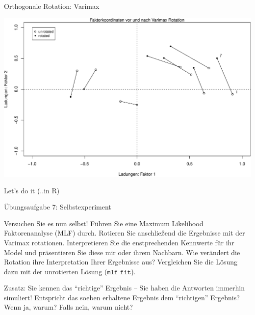 \documentclass[
  ignorenonframetext,
]{beamer}
\newenvironment{Shaded}{\begin{snugshade}}{\end{snugshade}}
\newcommand{\AttributeTok}[1]{\textcolor[rgb]{0.77,0.63,0.00}{#1}}
\newcommand{\CommentTok}[1]{\textcolor[rgb]{0.56,0.35,0.01}{\textit{#1}}}
\newcommand{\DecValTok}[1]{\textcolor[rgb]{0.00,0.00,0.81}{#1}}
\newcommand{\FunctionTok}[1]{\textcolor[rgb]{0.00,0.00,0.00}{#1}}
\newcommand{\NormalTok}[1]{#1}
\newcommand{\OtherTok}[1]{\textcolor[rgb]{0.56,0.35,0.01}{#1}}
\newcommand{\SpecialCharTok}[1]{\textcolor[rgb]{0.00,0.00,0.00}{#1}}
\newcommand{\StringTok}[1]{\textcolor[rgb]{0.31,0.60,0.02}{#1}}
\begin{document}
\begin{frame}[fragile]{Orthogonale Rotation: Varimax}
\begin{center}\includegraphics[width=0.7\linewidth]{06-EFA_files/figure-beamer/unnamed-chunk-7-1} \end{center}
\end{frame}

\begin{frame}[fragile]{Let's do it (..in R)}
\protect\hypertarget{lets-do-it-..in-r}{}
\begin{Shaded}
\end{Shaded}
\end{frame}

\begin{frame}{Übungsaufgabe 7: Selbstexperiment}
\protect\hypertarget{uxfcbungsaufgabe-7-selbstexperiment}{}
\begin{example}
Versuchen Sie es nun selbst! Führen Sie eine Maximum Likelihood Faktorenanalyse
(MLF) durch. Rotieren Sie anschließend die Ergebnisse mit der Varimax
rotationen. Interpretieren Sie die enstprechenden Kennwerte für ihr Model und
präsentieren Sie diese mir oder ihrem Nachbarn. Wie verändert die Rotation
ihre Interpretation Ihrer Ergebnisse aus? Vergleichen Sie die Lösung dazu mit
der unrotierten Lösung ($\texttt{mlf_fit}$).
\end{example}

Zusatz: Sie kennen das ``richtige'' Ergebnis -- Sie haben die Antworten
immerhin simuliert! Entspricht das soeben erhaltene Ergebnis dem
``richtigen'' Ergebnis? Wenn ja, warum? Falls nein, warum nicht?
\end{frame}
\end{document}
